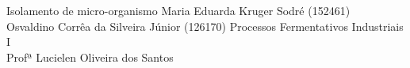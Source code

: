 \documentclass[12pt]{article}
\begin{document}
\capa
    {Isolamento de micro-organismo}
    {Maria Eduarda Kruger Sodré (152461) \\ Osvaldino Corrêa da Silveira Júnior (126170)}
    {Processos Fermentativos Industriais I \\ Profª Lucielen Oliveira dos Santos}

\tableofcontents
\newpage








\end{document}
